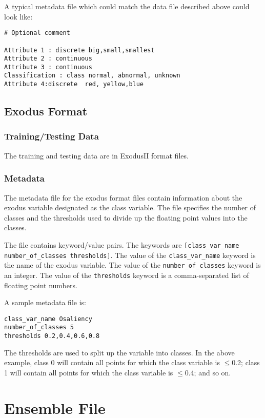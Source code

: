 \documentclass{article}
\begin{document}
A typical metadata file which could match the data file described above could look like:

\begin{verbatim}
# Optional comment

Attribute 1 : discrete big,small,smallest
Attribute 2 : continuous
Attribute 3 : continuous
Classification : class normal, abnormal, unknown
Attribute 4:discrete  red, yellow,blue
\end{verbatim}

\subsection{Exodus Format}

\subsubsection{Training/Testing Data}

The training and testing data are in ExodusII format files.

\subsubsection{Metadata}

The metadata file for the exodus format files contain information about the exodus variable
designated as the class variable. The file specifies the number of classes and the
thresholds used to divide up the floating point values into the classes.

The file contains keyword/value pairs. The keywords are \verb=[class_var_name number_of_classes thresholds]=.
The value of the \verb=class_var_name= keyword is the name of the exodus variable. The value of the
\verb=number_of_classes= keyword is an integer. The value of the \verb=thresholds= keyword is
a comma-separated list of floating point numbers.

A sample
metadata file is:

\begin{verbatim}
class_var_name Osaliency
number_of_classes 5
thresholds 0.2,0.4,0.6,0.8
\end{verbatim}

The thresholds are used to split up the variable into classes. In the
above example, class 0 will contain all points for which the class variable
is $\leq$0.2; class 1 will contain all points for which the class variable is $\leq$0.4; and so on.

\section{Ensemble File}
\end{document}

